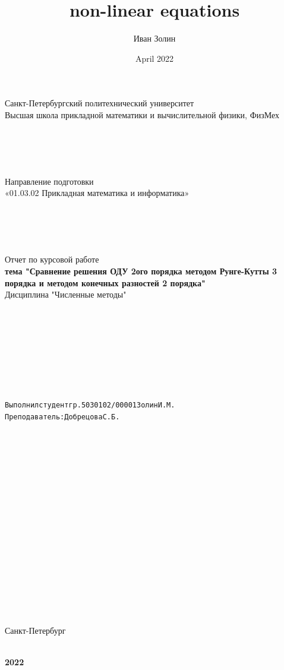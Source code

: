 \documentclass{article}
\title{non-linear equations}
\author{Иван Золин}
\date{April 2022}
\begin{document}
	
	\large
	\begin{center}
		
		Санкт-Петербургский политехнический университет\\
		Высшая школа прикладной математики и вычислительной физики, ФизМех
		
		~\\
		~\\
		~\\
		~\\
		Направление подготовки\\
		«01.03.02 Прикладная математика и информатика»
		
		~\\
		~\\
		~\\
		~\\
		Отчет по курсовой работе\\
		\textbf{тема "Сравнение решения ОДУ 2ого порядка методом Рунге-Кутты 3 порядка и методом конечных разностей 2 порядка" }	
		~\\	Дисциплина "Численные методы"
	\end{center}
	
	~\\
	~\\
	~\\
	~\\
	~\\
	~\\
	~\\
	\begin{alltt}
		\begin{center}
			Выполнил студент гр. 5030102/00001			  		   		  Золин И.М.
			Преподаватель: 				              	        	Добрецова С.Б.
		\end{center}
		
	\end{alltt}
	
	~\\
	~\\
	~\\
	~\\
	~\\
	~\\
	~\\
	~\\
	~\\
	~\\
	~\\
	~\\
	~\\
	~\\
	~\\
	~\\
	\begin{center}
		Санкт-Петербург
		
		~\\
		\textbf{2022}
		
	\end{center}{}
	
\end{document}
